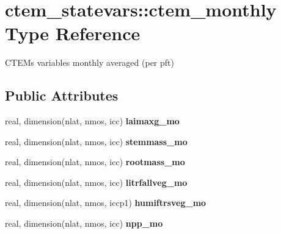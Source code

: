 \hypertarget{structctem__statevars_1_1ctem__monthly}{}\section{ctem\+\_\+statevars\+:\+:ctem\+\_\+monthly Type Reference}
\label{structctem__statevars_1_1ctem__monthly}


C\+T\+E\+M\textquotesingle{}s variables monthly averaged (per pft)  


\subsection*{Public Attributes}
\begin{DoxyCompactItemize}
\item 
\hypertarget{structctem__statevars_1_1ctem__monthly_ab8ec9d2a6de940a560ef93332802b6d8}{}real, dimension(nlat, nmos, icc) {\bfseries laimaxg\+\_\+mo}\label{structctem__statevars_1_1ctem__monthly_ab8ec9d2a6de940a560ef93332802b6d8}

\item 
\hypertarget{structctem__statevars_1_1ctem__monthly_a46baf8268c9f20263a8b44e95aeeb5a5}{}real, dimension(nlat, nmos, icc) {\bfseries stemmass\+\_\+mo}\label{structctem__statevars_1_1ctem__monthly_a46baf8268c9f20263a8b44e95aeeb5a5}

\item 
\hypertarget{structctem__statevars_1_1ctem__monthly_aa9c587921959995f8e4ef94cb02752ee}{}real, dimension(nlat, nmos, icc) {\bfseries rootmass\+\_\+mo}\label{structctem__statevars_1_1ctem__monthly_aa9c587921959995f8e4ef94cb02752ee}

\item 
\hypertarget{structctem__statevars_1_1ctem__monthly_ae81982081de20c7df0ddfa32872bf034}{}real, dimension(nlat, nmos, icc) {\bfseries litrfallveg\+\_\+mo}\label{structctem__statevars_1_1ctem__monthly_ae81982081de20c7df0ddfa32872bf034}

\item 
\hypertarget{structctem__statevars_1_1ctem__monthly_a1fb1a62b85a1a192e00debc085e6102e}{}real, dimension(nlat, nmos, iccp1) {\bfseries humiftrsveg\+\_\+mo}\label{structctem__statevars_1_1ctem__monthly_a1fb1a62b85a1a192e00debc085e6102e}

\item 
\hypertarget{structctem__statevars_1_1ctem__monthly_a9c83d18887db82a869492091792c87d6}{}real, dimension(nlat, nmos, icc) {\bfseries npp\+\_\+mo}\label{structctem__statevars_1_1ctem__monthly_a9c83d18887db82a869492091792c87d6}


\end{DoxyCompactItemize}
